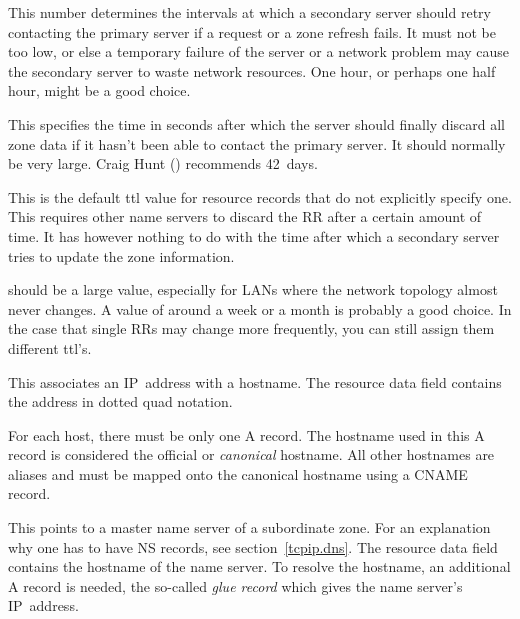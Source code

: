 \documentclass[11pt,makeidx]{report}
\def\emph#1{{\em{#1}}}
\begin{document}
{\begin{dispitems}
\begin{dispitems}
        This number determines the intervals at which a secondary
        server should retry contacting the primary server if
        a request or a zone refresh fails. It must not be too low,
        or else a temporary failure of the server or a network problem
        may cause the secondary server to waste network resources.
        One hour, or perhaps one half hour, might be a good choice.

        This specifies the time in seconds after which the server should
        finally discard all zone data if it hasn't been able to contact
        the primary server. It should normally be very large.  Craig
        Hunt (\cite{hunt-tcpip}) recommends 42~days.

        This is the default ttl value for resource records that do not
        explicitly specify one. This requires other name servers to
        discard the RR after a certain amount of time.  It has however
        nothing to do with the time after which a secondary server tries
        to update the zone information.

         should be a large value, especially for LANs where
        the network topology almost never changes.  A value of around a
        week or a month is probably a good choice. In the case that
        single RRs may change more frequently, you can still assign them
        different ttl's.

\end{dispitems}


\ditem[A]

This associates an IP~address with a hostname. The resource data field
contains the address in dotted quad notation.

For each host, there must be only one A record. The hostname used in
this A record is considered the official or \emph{canonical} hostname.
All other hostnames are aliases and must be mapped onto the canonical
hostname using a CNAME record.



\ditem[NS]

This points to a master name server of a subordinate zone. For an
explanation why one has to have NS records, see section~\ref{tcpip.dns}.
The resource data field contains the hostname of the name server. To
resolve the hostname, an additional A record is needed, the so-called
\emph{glue record} which gives the name server's IP~address.



\end{dispitems}}
\end{document}
